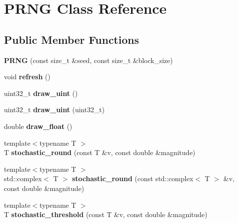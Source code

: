 \hypertarget{classPRNG}{}\section{P\+R\+NG Class Reference}
\label{classPRNG}
\subsection*{Public Member Functions}
\begin{DoxyCompactItemize}
\item 
{\bfseries P\+R\+NG} (const size\+\_\+t \&seed, const size\+\_\+t \&block\+\_\+size)\hypertarget{classPRNG_a796e61054adad207a8ead9b35a1db8bd}{}\label{classPRNG_a796e61054adad207a8ead9b35a1db8bd}

\item 
void {\bfseries refresh} ()\hypertarget{classPRNG_ad7fb46ec7c402ac356db87c9cd1b4a01}{}\label{classPRNG_ad7fb46ec7c402ac356db87c9cd1b4a01}

\item 
uint32\+\_\+t {\bfseries draw\+\_\+uint} ()\hypertarget{classPRNG_aa665deb0123d716d60900242ef2a0fc4}{}\label{classPRNG_aa665deb0123d716d60900242ef2a0fc4}

\item 
uint32\+\_\+t {\bfseries draw\+\_\+uint} (uint32\+\_\+t)\hypertarget{classPRNG_a1370ce57c21cf1a8cca9795c634cc90d}{}\label{classPRNG_a1370ce57c21cf1a8cca9795c634cc90d}

\item 
double {\bfseries draw\+\_\+float} ()\hypertarget{classPRNG_a269a82557b8441abb23115ee3dae6fe7}{}\label{classPRNG_a269a82557b8441abb23115ee3dae6fe7}

\item 
{\footnotesize template$<$typename T $>$ }\\T {\bfseries stochastic\+\_\+round} (const T \&v, const double \&magnitude)\hypertarget{classPRNG_aab9a485112c72eb4c3e558ae2c0d9f14}{}\label{classPRNG_aab9a485112c72eb4c3e558ae2c0d9f14}

\item 
{\footnotesize template$<$typename T $>$ }\\std\+::complex$<$ T $>$ {\bfseries stochastic\+\_\+round} (const std\+::complex$<$ T $>$ \&v, const double \&magnitude)\hypertarget{classPRNG_ae7ec9a3617b28465b1932653ea29cb72}{}\label{classPRNG_ae7ec9a3617b28465b1932653ea29cb72}

\item 
{\footnotesize template$<$typename T $>$ }\\T {\bfseries stochastic\+\_\+threshold} (const T \&v, const double \&magnitude)\hypertarget{classPRNG_a732293bc69290f6b972e3c3cc5d94646}{}\label{classPRNG_a732293bc69290f6b972e3c3cc5d94646}

\end{DoxyCompactItemize}


